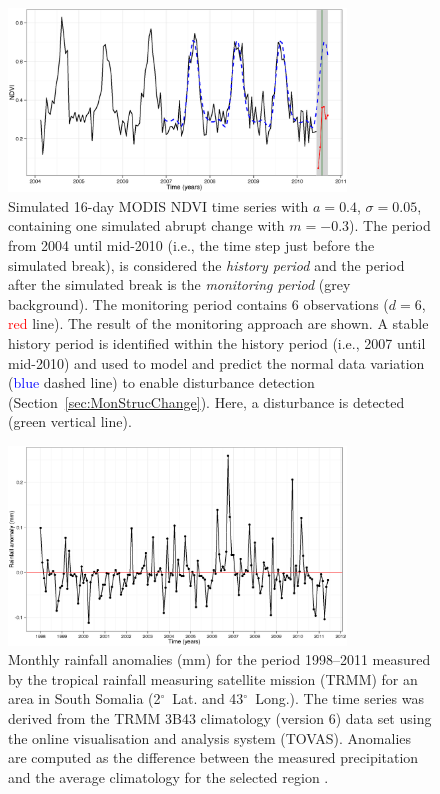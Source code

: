 \documentclass[authoryear,preprint,review,10pt]{elsarticle}
\newcommand{\degree}{\ensuremath{^\circ}}
\begin{document}
 \begin{figure}[htp]
\centering
    \includegraphics[width=0.8\textwidth]{figs/Fig1_Sim_Monitoring_ggplot.eps}
  \caption{Simulated 16-day MODIS NDVI time series with $a = 0.4$, $\sigma = 0.05$, containing one simulated abrupt change with $m = -0.3$). The period from 2004 until mid-2010 (i.e., the time step just before the simulated break), is considered the \emph{history period} and the period after the simulated break is the \emph{monitoring period} (grey background). The monitoring period contains 6 observations  ($d = 6$, \textcolor{red} {red} line). The result of the monitoring approach are shown. A stable history period is identified within the history period (i.e., 2007 until mid-2010) and used to model and predict the normal data variation (\textcolor{blue} {blue} dashed line) to enable disturbance detection (Section~\ref{sec:MonStrucChange}).  Here, a disturbance is detected (\textcolor{OliveGreen} {green} vertical line).}
  \label{fig:SimMonitor}
\end{figure}

 \begin{figure}[htp]
\centering
    \includegraphics[width=0.8\textwidth]{figs/Fig2_RainfallAnomaly.eps}
  \caption{Monthly rainfall anomalies (mm) for the period 1998--2011 measured by the tropical rainfall measuring satellite mission (TRMM) for an area in South Somalia (2\degree~Lat. and 43\degree~Long.). The time series was derived from the TRMM 3B43 climatology (version 6) data set using the online visualisation and analysis system (TOVAS). Anomalies are computed as the difference between the measured precipitation and the average climatology for the selected region \citep{Acker:2007vk}.}
  \label{fig:RF}
\end{figure}
\end{document}
